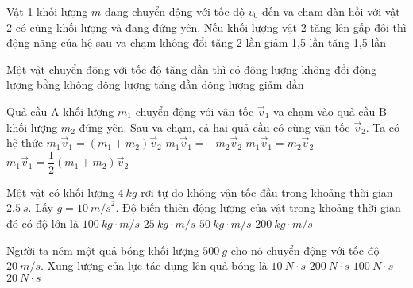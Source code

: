 \begin{ex}
Vật 1 khối lượng $m$ đang chuyển động với tốc độ $v_0$ đến va chạm đàn hồi với vật 2 có cùng khối lượng và đang đứng yên. Nếu khối lượng vật 2 tăng lên gấp đôi thì động năng của hệ sau va chạm	
	\choice
	{\True không đổi}
	{tăng 2 lần}
	{giảm 1,5 lần}
	{tăng 1,5 lần}
\end{ex}
\begin{ex}
	Một vật chuyển động với tốc độ tăng dần thì có
	\choice
	{động lượng không đổi}
	{động lượng bằng không}
	{\True động lượng tăng dần}
	{động lượng giảm dần}
	\loigiai{}
\end{ex}
\begin{ex}
	Quả cầu A khối lượng $m_1$ chuyển động với vận tốc $\vec v_1$ va chạm vào quả cầu B khối lượng $m_2$ đứng yên. Sau va chạm, cả hai quả cầu có cùng vận tốc $\vec v_2$. Ta có hệ thức
	\choice
	{\True $m_1\vec v_1 = (m_1 + m_2) \vec v_2$}
	{$m_1\vec v_1 = -m_2 \vec v_2$}
	{$m_1\vec v_1 = m_2 \vec v_2$}
	{$m_1\vec v_1 = \dfrac{1}{2}(m_1 + m_2) \vec v_2$}
	\loigiai{}
\end{ex}
\begin{ex}
Một vật có khối lượng $\SI{4}{kg}$ rơi tự do không vận tốc đầu trong khoảng thời gian $\SI{2,5}{s}$. Lấy $g = \SI{10}{m/s}^2$. Độ biến thiên động lượng của vật trong khoảng thời gian đó có độ lớn là	
	\choice
	{\True $\SI{100}{kg\cdot m/s}$}
	{$\SI{25}{kg\cdot m/s}$}
	{$\SI{50}{kg\cdot m/s}$}
	{$\SI{200}{kg\cdot m/s}$}
\end{ex}
	\begin{ex}
		Người ta ném một quả bóng khối lượng $\SI{500}{g}$ cho nó chuyển động với tốc độ $\SI{20}{m/s}$. Xung lượng của lực tác dụng lên quả bóng là
		\choice
		{\True $\SI{10}{N\cdot s}$}
		{$\SI{200}{N\cdot s}$}
		{$\SI{100}{N\cdot s}$}
		{$\SI{20}{N\cdot s}$}
	\end{ex}
